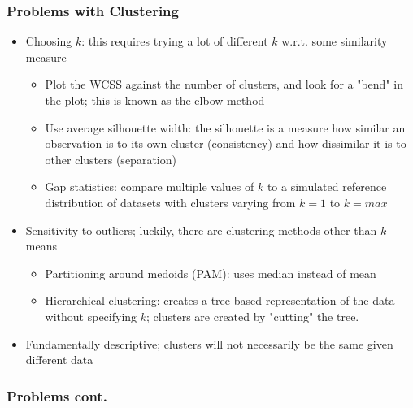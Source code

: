 \documentclass{beamer}
\begin{document}
\begin{frame}
	\frametitle{Problems with Clustering}
	\begin{itemize}
		\item Choosing $k$: this requires trying a lot of different $k$ w.r.t. some similarity measure
			\begin{itemize}
				\item Plot the WCSS against the number of clusters, and look for a "bend" in the plot; this is known as the elbow method
				\item Use average silhouette width: the silhouette is a measure how similar an observation is to its own cluster (consistency) and how dissimilar it is to other clusters (separation)
				\item Gap statistics: compare multiple values of $k$ to a simulated reference distribution of datasets with clusters varying from $k=1$ to $k=max$
			\end{itemize}
		\item Sensitivity to outliers; luckily, there are clustering methods other than $k$-means
			\begin{itemize}
				\item Partitioning around medoids (PAM): uses median instead of mean
				\item Hierarchical clustering: creates a tree-based representation of the data without specifying $k$; clusters are created by "cutting" the tree.  
			\end{itemize}
		\item Fundamentally descriptive; clusters will not necessarily be the same given different data
	\end{itemize}
\end{frame}

\begin{frame}
\frametitle{Problems cont.}



\end{frame}
 
\end{document}
